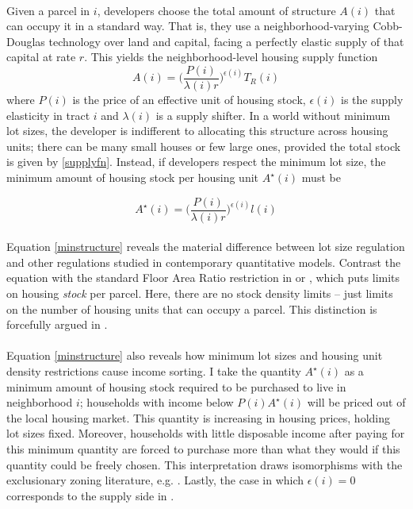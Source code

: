 \documentclass[]{article}
\begin{document}
\paragraph*{}
Given a parcel in $i$, developers choose the total amount of structure $A(i)$ that can occupy it in a standard way. That is, they use a neighborhood-varying Cobb-Douglas technology over land and capital, facing a perfectly elastic supply of that capital at rate $r$. This yields the neighborhood-level housing supply function
\begin{equation}\label{supplyfn}
	A(i) = \bigg(\frac{P(i)}{\lambda(i)r}\bigg)^{\epsilon(i)}T_{R}(i)
\end{equation}
where $P(i)$ is the price of an effective unit of housing stock, $\epsilon(i)$ is the supply elasticity in tract $i$ and $\lambda(i)$ is a supply shifter. In a world without minimum lot sizes, the developer is indifferent to allocating this structure across housing units; there can be many small houses or few large ones, provided the total stock is given by \eqref{supplyfn}. Instead, if developers respect the minimum lot size, the minimum amount of housing stock per housing unit $A^{\star}(i)$ must be

\begin{equation}\label{minstructure}
	A^{\star}(i) = \bigg(\frac{P(i)}{\lambda(i)r}\bigg)^{\epsilon(i)}l(i)
\end{equation}

\paragraph*{}
Equation \eqref{minstructure} reveals the material difference between lot size regulation and other regulations studied in contemporary quantitative models. Contrast the equation with the standard Floor Area Ratio restriction in \cite{bruecknersingh} or \cite{BruecknerFuGu}, which puts limits on housing \textit{stock} per parcel. Here, there are no stock density  limits -- just limits on the number of housing units that can occupy a parcel. This distinction is forcefully argued in \cite{griesonwhite}.

\paragraph*{}
Equation \eqref{minstructure} also reveals how minimum lot sizes and housing unit density restrictions cause income sorting. I take the quantity $A^{\star}(i)$ as a minimum amount of housing stock required to be purchased to live in neighborhood $i$; households with income below $P(i)A^{\star}(i)$ will be priced out of the local housing market. This quantity is increasing in housing prices, holding lot sizes fixed. Moreover, households with little disposable income after paying for this minimum quantity are forced to purchase more than what they would if this quantity could be freely chosen. This interpretation draws isomorphisms with the exclusionary zoning literature, e.g. \cite{keepingpeopleout}. Lastly, the case in which $\epsilon(i) = 0$ corresponds to the supply side in \cite{kulka}. 
\end{document}
